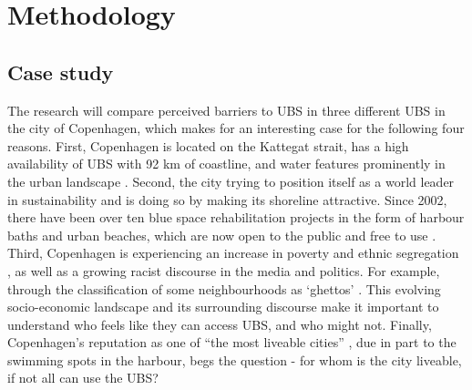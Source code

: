 \documentclass{article}
\begin{document}
\section{Methodology}


\subsection{Case study}

The research will compare perceived barriers to UBS in three different UBS in the city of Copenhagen, which makes for an interesting case for the following four reasons. First, Copenhagen is located on the Kattegat strait, has a high availability of UBS with 92 km of coastline, and water features prominently in the urban landscape \parencite{comertler2017greens}. Second, the city trying to position itself as a world leader in sustainability and is doing so by making its shoreline attractive. Since 2002, there have been over ten blue space rehabilitation projects in the form of harbour baths and urban beaches, which are now open to the public and free to use \parencite{visitcopenhagen_baths}. Third, Copenhagen is experiencing an increase in poverty and ethnic segregation \parencite{moller2015socioeconomic}, as well as a growing racist discourse in the media and politics. For example, through the classification of some neighbourhoods as ‘ghettos’ \parencite{simonsen2008practice}. This evolving socio-economic landscape and its surrounding discourse make it important to understand who feels like they can access UBS, and who might not. Finally, Copenhagen’s reputation as one of ``the most liveable cities'' \parencite{visitdenmark_2021}, due in part to the swimming spots in the harbour, begs the question - for whom is the city liveable, if not all can use the UBS?
\end{document}
